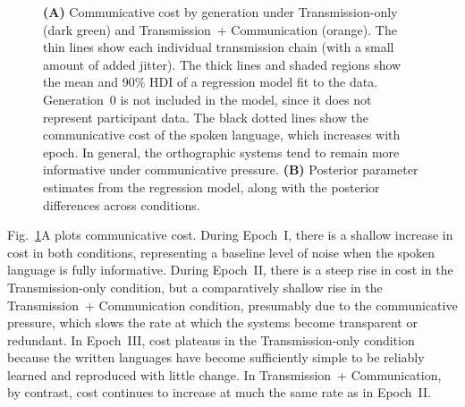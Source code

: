 \documentclass[doc,biblatex]{apa7}
\begin{document}
	\begin{figure}
	\vspace*{2pt}
	\caption{\textbf{(A)} Communicative cost by generation under Transmission-only (dark green) and Transmission~+ Communication (orange). The thin lines show each individual transmission chain (with a small amount of added jitter). The thick lines and shaded regions show the mean and 90\% HDI of a regression model fit to the data. Generation~0 is not included in the model, since it does not represent participant data. The black dotted lines show the communicative cost of the spoken language, which increases with epoch. In general, the orthographic systems tend to remain more informative under communicative pressure. \textbf{(B)} Posterior parameter estimates from the regression model, along with the posterior differences across conditions.}
	\label{cost_con}
	\end{figure}

Fig.~\ref{cost_con}A plots communicative cost. During Epoch~I, there is a shallow increase in cost in both conditions, representing a baseline level of noise when the spoken language is fully informative. During Epoch~II, there is a steep rise in cost in the Transmission-only condition, but a comparatively shallow rise in the Transmission~+ Communication condition, presumably due to the communicative pressure, which slows the rate at which the systems become transparent or redundant. In Epoch~III, cost plateaus in the Transmission-only condition because the written languages have become sufficiently simple to be reliably learned and reproduced with little change. In Transmission~+ Communication, by contrast, cost continues to increase at much the same rate as in Epoch~II.
\end{document}
